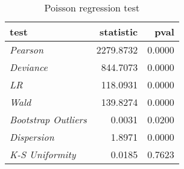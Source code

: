 \begin{table}[H]

\caption{\label{tab:poisson_reg_tests}Poisson regression test}
\centering
\begin{tabular}[t]{>{}l|r|r}
\hline
test & statistic & pval\\
\hline
\hline
\em{Pearson} & 2279.8732 & 0.0000\\
\hline
\em{Deviance} & 844.7073 & 0.0000\\
\hline
\em{LR} & 118.0931 & 0.0000\\
\hline
\em{Wald} & 139.8274 & 0.0000\\
\hline
\em{Bootstrap Outliers} & 0.0031 & 0.0200\\
\hline
\em{Dispersion} & 1.8971 & 0.0000\\
\hline
\em{K-S Uniformity} & 0.0185 & 0.7623\\
\hline
\end{tabular}
\end{table}